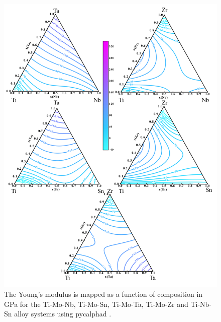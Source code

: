 \pagebreak
\begin{figure}[H]
	\centering
	\includegraphics[width=\textwidth]{Chapter-6/Figures/tixymap2.png}
	\caption{The Young's modulus is mapped as a function of composition in GPa for the Ti-Mo-Nb, Ti-Mo-Sn, Ti-Mo-Ta, Ti-Mo-Zr and Ti-Nb-Sn alloy systems using pycalphad \cite{Otis2017}.}
	\label{Ch6-figure:tixymap2}
\end{figure}

